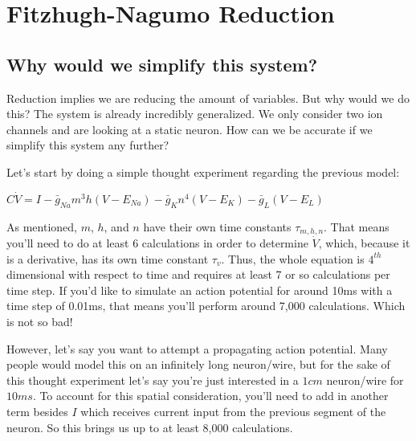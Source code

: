 \documentclass[12pt]{amsart}
\begin{document}
\section{Fitzhugh-Nagumo Reduction}

\subsection{Why would we simplify this system?} Reduction implies we are reducing the amount of variables. But why would we do this? The system is already incredibly generalized. We only consider two ion channels and are looking at a static neuron. How can we be accurate if we simplify this system any further?\newline

Let's start by doing a simple thought experiment regarding the previous model: 

\bigskip

\begin{center}

    $C\dot{V} = I - \bar{g}_{Na}m^3h(V - E_{Na}) - \bar{g}_{K}n^4(V - E_{K}) - \bar{g}_{L}(V - E_{L})$
    
\end{center}

\bigskip

As mentioned, $m$, $h$, and $n$ have their own time constants $\tau_{m,h,n}$. That means you'll need to do at least 6 calculations in order to determine $\dot{V}$, which, because it is a derivative, has its own time constant $\tau_v$. Thus, the whole equation is $4^{th}$ dimensional with respect to time and requires at least 7 or so calculations per time step. If you'd like to simulate an action potential for around 10ms with a time step of 0.01ms, that means you'll perform around 7,000 calculations. Which is not so bad!\newline 

However, let's say you want to attempt a propagating action potential. Many people would model this on an infinitely long neuron/wire, but for the sake of this thought experiment let's say you're just interested in a $1cm$ neuron/wire for $10ms$. To account for this spatial consideration, you'll need to add in another term besides $I$ which receives  current input from the previous segment of the neuron. So this brings us up to at least 8,000 calculations.\newline
\end{document}
